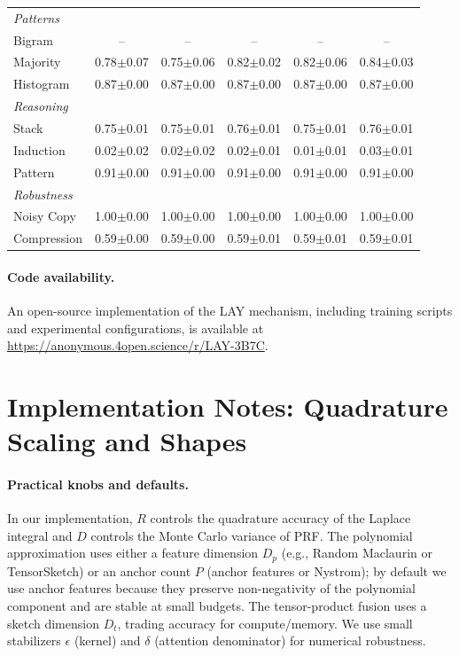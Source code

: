 \documentclass{article}
\begin{document}
\begin{table}[t]
\begin{tabular}{lccccc}
\midrule
\multicolumn{6}{l}{\emph{Patterns}} \\
Bigram          & -- & -- & -- & -- & -- \\
Majority        & 0.78$\pm$0.07 & 0.75$\pm$0.06 & 0.82$\pm$0.02 & 0.82$\pm$0.06 & 0.84$\pm$0.03 \\
Histogram       & 0.87$\pm$0.00 & 0.87$\pm$0.00 & 0.87$\pm$0.00 & 0.87$\pm$0.00 & 0.87$\pm$0.00 \\
\midrule
\multicolumn{6}{l}{\emph{Reasoning}} \\
Stack           & 0.75$\pm$0.01 & 0.75$\pm$0.01 & 0.76$\pm$0.01 & 0.75$\pm$0.01 & 0.76$\pm$0.01 \\
Induction       & 0.02$\pm$0.02 & 0.02$\pm$0.02 & 0.02$\pm$0.01 & 0.01$\pm$0.01 & 0.03$\pm$0.01 \\
Pattern         & 0.91$\pm$0.00 & 0.91$\pm$0.00 & 0.91$\pm$0.00 & 0.91$\pm$0.00 & 0.91$\pm$0.00 \\
\midrule
\multicolumn{6}{l}{\emph{Robustness}} \\
Noisy Copy      & 1.00$\pm$0.00 & 1.00$\pm$0.00 & 1.00$\pm$0.00 & 1.00$\pm$0.00 & 1.00$\pm$0.00 \\
Compression     & 0.59$\pm$0.00 & 0.59$\pm$0.00 & 0.59$\pm$0.01 & 0.59$\pm$0.01 & 0.59$\pm$0.01 \\
\bottomrule
\end{tabular}
\end{table}

\paragraph{Code availability.}
An open-source implementation of the LAY mechanism, including training scripts and experimental configurations, is available at
\url{https://anonymous.4open.science/r/LAY-3B7C}.


\section{Implementation Notes: Quadrature Scaling and Shapes}
\label{app:impl}

\paragraph{Practical knobs and defaults.}
In our implementation, $R$ controls the quadrature accuracy of the Laplace integral and $D$ controls the Monte Carlo variance of PRF. The polynomial approximation uses either a feature dimension $D_p$ (e.g., Random Maclaurin or TensorSketch) or an anchor count $P$ (anchor features or Nystrom); by default we use anchor features because they preserve non-negativity of the polynomial component and are stable at small budgets.
The tensor-product fusion uses a sketch dimension $D_t$, trading accuracy for compute/memory. We use small stabilizers $\epsilon$ (kernel) and $\delta$ (attention denominator) for numerical robustness.
\end{document}
